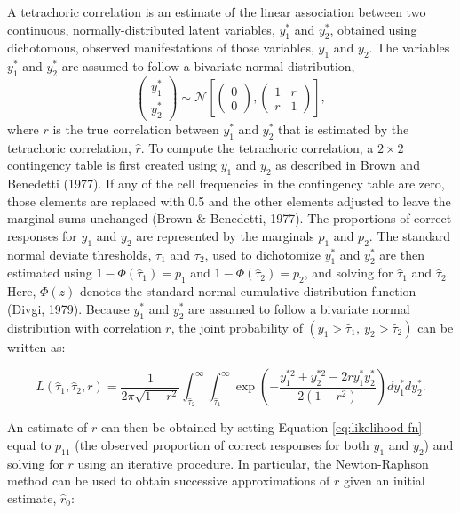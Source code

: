 \documentclass[
  english,
  man]{apa6}
\begin{document}
A tetrachoric correlation is an estimate of the linear association between two continuous, normally-distributed latent variables, \(y_1^*\) and \(y_2^*\), obtained using dichotomous, observed manifestations of those variables, \(y_1\) and \(y_2\). The variables \(y_1^*\) and \(y_2^*\) are assumed to follow a bivariate normal distribution,
\[
\left(\begin{array}{l}
y_{1}^* \\
y_{2}^*
\end{array}\right) \sim \mathcal{N}\left[\left(\begin{array}{l}
0 \\
0
\end{array}\right),\left(\begin{array}{cc}
1 & r \\
r & 1
\end{array}\right)\right],
\]
where \(r\) is the true correlation between \(y_1^*\) and \(y_2^*\) that is estimated by the tetrachoric correlation, \(\hat{r}\). To compute the tetrachoric correlation, a \(2 \times 2\) contingency table is first created using \(y_1\) and \(y_2\) as described in Brown and Benedetti (1977). If any of the cell frequencies in the contingency table are zero, those elements are replaced with 0.5 and the other elements adjusted to leave the marginal sums unchanged (Brown \& Benedetti, 1977). The proportions of correct responses for \(y_1\) and \(y_2\) are represented by the marginals \(p_1\) and \(p_2\). The standard normal deviate thresholds, \(\tau_1\) and \(\tau_2\), used to dichotomize \(y^*_1\) and \(y^*_2\) are then estimated using \(1 - \Phi(\hat{\tau}_1) = p_1\) and \(1 - \Phi(\hat{\tau}_2) = p_2\), and solving for \(\hat{\tau}_1\) and \(\hat{\tau}_2\). Here, \(\Phi(z)\) denotes the standard normal cumulative distribution function (Divgi, 1979). Because \(y_1^*\) and \(y_2^*\) are assumed to follow a bivariate normal distribution with correlation \(r\), the joint probability of \((y_1 > \hat{\tau}_1, \: y_2 > \hat{\tau}_2)\) can be written as:

\begin{equation}
L(\hat{\tau}_1, \hat{\tau}_2, r)=\frac{1}{2 \pi \sqrt{1-r^{2}}} \int_{\hat{\tau}_2}^{\infty} \int_{\hat{\tau}_1}^{\infty} \exp \left(-\frac{y_1^{*2}+y_2^{*2}-2 r y_1^* y_2^*}{2\left(1-r^{2}\right)}\right) d y_1^* d y_2^*.
\label{eq:likelihood-fn}
\end{equation}

An estimate of \(r\) can then be obtained by setting Equation \eqref{eq:likelihood-fn} equal to \(p_{11}\) (the observed proportion of correct responses for both \(y_1\) and \(y_2\)) and solving for \(r\) using an iterative procedure. In particular, the Newton-Raphson method can be used to obtain successive approximations of \(r\) given an initial estimate, \(\hat{r}_0\):
\end{document}
